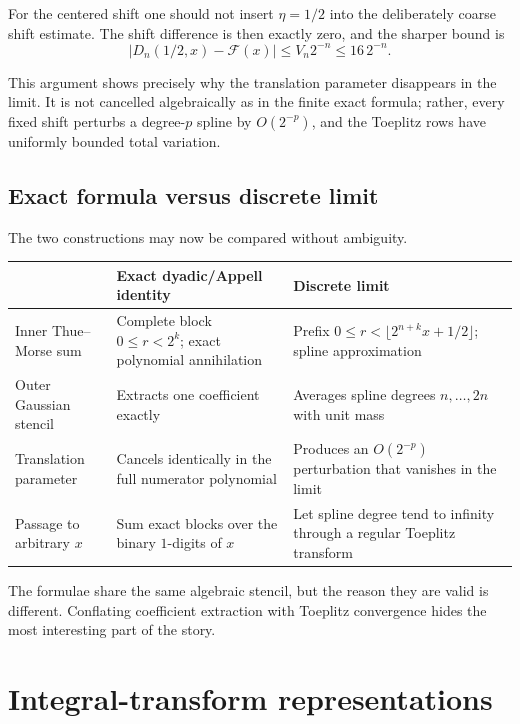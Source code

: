\documentclass[11pt,oneside]{article}
\theoremstyle{definition}
\theoremstyle{remark}
\newcommand{\Fglobal}{\mathcal F}
\begin{document}
For the centered shift one should not insert $\eta=1/2$ into the deliberately
coarse shift estimate.  The shift difference is then exactly zero, and the
sharper bound is
\begin{equation}\label{eq:Dn-centered-rate}
 |D_n(1/2,x)-\Fglobal(x)|\le V_n2^{-n}\le16\,2^{-n}.
\end{equation}

This argument shows precisely why the translation parameter disappears in the
limit.  It is not cancelled algebraically as in the finite exact formula;
rather, every fixed shift perturbs a degree-$p$ spline by $O(2^{-p})$, and the
Toeplitz rows have uniformly bounded total variation.

\subsection{Exact formula versus discrete limit}

The two constructions may now be compared without ambiguity.

\begin{center}
\renewcommand{\arraystretch}{1.25}
\begin{tabularx}{0.94\textwidth}{>{\raggedright\arraybackslash}p{}XX}
\toprule
 & Exact dyadic/Appell identity & Discrete limit \\
\midrule
Inner Thue--Morse sum
 & Complete block $0\le r<2^k$; exact polynomial annihilation
 & Prefix $0\le r<\lfloor2^{n+k}x+1/2\rfloor$; spline approximation \\
Outer Gaussian stencil
 & Extracts one coefficient exactly
 & Averages spline degrees $n,\ldots,2n$ with unit mass \\
Translation parameter
 & Cancels identically in the full numerator polynomial
 & Produces an $O(2^{-p})$ perturbation that vanishes in the limit \\
Passage to arbitrary $x$
 & Sum exact blocks over the binary $1$-digits of $x$
 & Let spline degree tend to infinity through a regular Toeplitz transform \\
\bottomrule
\end{tabularx}
\end{center}

The formulae share the same algebraic stencil, but the reason they are valid is
different.  Conflating coefficient extraction with Toeplitz convergence hides
the most interesting part of the story.

\section{Integral-transform representations}
\end{document}
